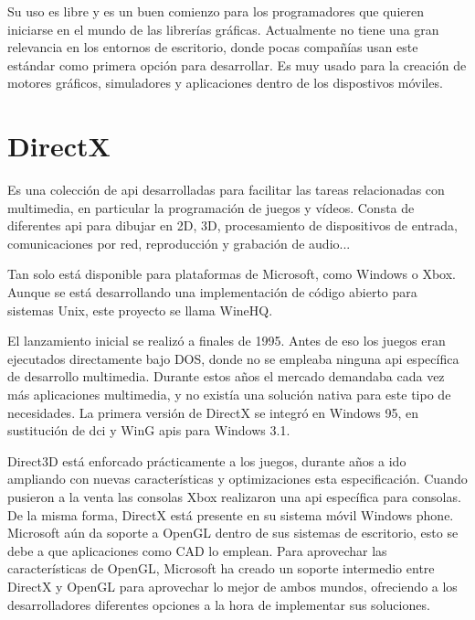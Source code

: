 Su uso es libre y es un buen comienzo para los programadores que quieren iniciarse en el mundo de las librerías
gráficas. Actualmente no tiene una gran relevancia en los entornos de escritorio, donde pocas compañías usan este
estándar como primera opción para desarrollar. Es muy usado para la creación de motores gráficos, simuladores y
aplicaciones dentro de los dispostivos móviles.

\section{DirectX}
Es una colección de \gls{api} desarrolladas para facilitar las tareas relacionadas con multimedia, en particular la
programación de juegos y vídeos. Consta de diferentes \gls{api} para dibujar en 2D, 3D, procesamiento de dispositivos
de entrada, comunicaciones por red, reproducción y grabación de audio...

Tan solo está disponible para plataformas de Microsoft, como Windows o Xbox. Aunque se está desarrollando una
implementación de código abierto para sistemas Unix, este proyecto se llama WineHQ.

El lanzamiento inicial se realizó a finales de 1995. Antes de eso los juegos eran ejecutados directamente bajo DOS,
donde no se empleaba ninguna \gls{api} específica de desarrollo multimedia. Durante estos años el mercado demandaba
cada vez más aplicaciones multimedia, y no existía una solución nativa para este tipo de necesidades. La primera
versión de DirectX se integró en Windows 95, en sustitución de \gls{dci} y WinG \gls{api}s para Windows 3.1.

Direct3D está enforcado prácticamente a los juegos, durante años a ido ampliando con nuevas características y
optimizaciones esta especificación. Cuando pusieron a la venta las consolas Xbox realizaron una \gls{api} específica
para consolas. De la misma forma, DirectX está presente en su sistema móvil Windows phone. Microsoft aún da soporte a
OpenGL dentro de sus sistemas de escritorio, esto se debe a que aplicaciones como CAD lo emplean. Para aprovechar
las características de OpenGL, Microsoft ha creado un soporte intermedio entre DirectX y OpenGL para aprovechar lo mejor
de ambos mundos, ofreciendo a los desarrolladores diferentes opciones a la hora de implementar sus soluciones.
